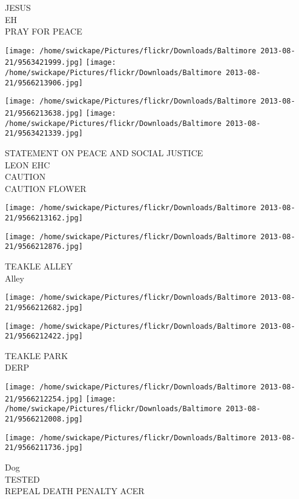 \documentclass[10pt,letterpaper]{article}
\begin{document}
JESUS\\
EH\\
PRAY FOR PEACE\\
\pagebreak

\texttt{[image: /home/swickape/Pictures/flickr/Downloads/Baltimore 2013-08-21/9563421999.jpg]}
\texttt{[image: /home/swickape/Pictures/flickr/Downloads/Baltimore 2013-08-21/9566213906.jpg]}

\texttt{[image: /home/swickape/Pictures/flickr/Downloads/Baltimore 2013-08-21/9566213638.jpg]}
\texttt{[image: /home/swickape/Pictures/flickr/Downloads/Baltimore 2013-08-21/9563421339.jpg]}

STATEMENT ON PEACE AND SOCIAL JUSTICE\\
LEON EHC\\
CAUTION\\
CAUTION FLOWER\\
\pagebreak

\texttt{[image: /home/swickape/Pictures/flickr/Downloads/Baltimore 2013-08-21/9566213162.jpg]}

\vspace{0.25in}
\texttt{[image: /home/swickape/Pictures/flickr/Downloads/Baltimore 2013-08-21/9566212876.jpg]}

TEAKLE ALLEY\\
Alley\\
\pagebreak

\texttt{[image: /home/swickape/Pictures/flickr/Downloads/Baltimore 2013-08-21/9566212682.jpg]}

\vspace{0.25in}
\texttt{[image: /home/swickape/Pictures/flickr/Downloads/Baltimore 2013-08-21/9566212422.jpg]}

TEAKLE PARK\\
DERP\\
\pagebreak

\texttt{[image: /home/swickape/Pictures/flickr/Downloads/Baltimore 2013-08-21/9566212254.jpg]}
\texttt{[image: /home/swickape/Pictures/flickr/Downloads/Baltimore 2013-08-21/9566212008.jpg]}

\vspace{0.25in}
\texttt{[image: /home/swickape/Pictures/flickr/Downloads/Baltimore 2013-08-21/9566211736.jpg]}

Dog\\
TESTED\\
REPEAL DEATH PENALTY ACER\\
\pagebreak
\end{document}
